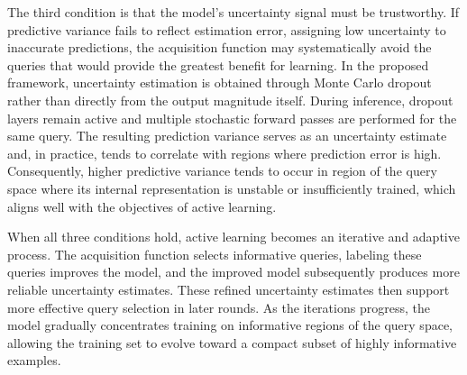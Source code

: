 The third condition is that the model’s uncertainty signal must be trustworthy. If predictive variance fails to reflect estimation error, assigning low uncertainty to inaccurate predictions, the acquisition function may systematically avoid the queries that would provide the greatest benefit for learning. In the proposed framework, uncertainty estimation is obtained through Monte Carlo dropout rather than directly from the output magnitude itself. During inference, dropout layers remain active and multiple stochastic forward passes are performed for the same query. The resulting prediction variance serves as an uncertainty estimate and, in practice, tends to correlate with regions where prediction error is high. Consequently, higher predictive variance tends to occur in region of the query space where its internal representation is unstable or insufficiently trained, which aligns well with the objectives of active learning.

When all three conditions hold, active learning becomes an iterative and adaptive process. The acquisition function selects informative queries, labeling these queries improves the model, and the improved model subsequently produces more reliable uncertainty estimates. These refined uncertainty estimates then support more effective query selection in later rounds. As the iterations progress, the model gradually concentrates training on informative regions of the query space, allowing the training set to evolve toward a compact subset of highly informative examples.